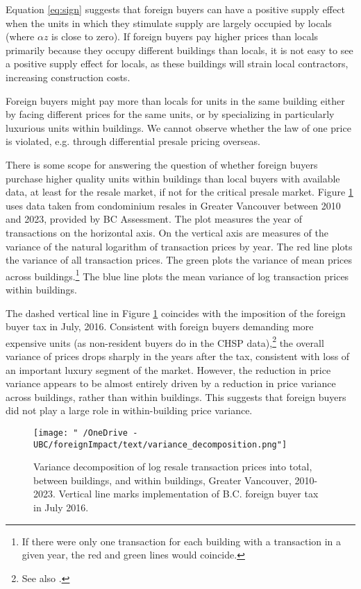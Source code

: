 \documentclass[12pt]{article}
\begin{document}
Equation \eqref{eq:sign} suggests that foreign buyers can have a positive
supply effect when the units in which they stimulate supply are largely
occupied by locals (where $\alpha z$ is close to zero). If foreign buyers pay
higher prices than locals primarily because they occupy different buildings than
locals, it is not easy to see a positive supply effect for
locals, as these buildings will strain local contractors, increasing
construction costs.

Foreign buyers might pay more than locals for units in the same building either
by facing different prices for the same units, or by specializing in
particularly luxurious units within buildings. We cannot observe whether the
law of one price is violated, e.g.  through differential presale pricing
overseas.

There is some scope for answering the question of whether foreign buyers
purchase higher quality units within buildings than local buyers with available
data, at least for the resale market, if not for the critical presale market.
Figure \ref{fig:varianceDecomposition} uses data taken from condominium
resales in Greater Vancouver between 2010 and 2023, provided by BC Assessment.
The plot measures the year of transactions on the horizontal axis. On the
vertical axis are measures of the variance of the natural logarithm of
transaction prices by year. The red line plots the variance of all transaction
prices. The green plots the variance of mean prices across
buildings.\footnote{If there were only one transaction for each building with a
transaction in a given year, the red and green lines would coincide.} The blue
line plots the mean variance of log transaction prices within buildings. 

The dashed vertical line in Figure \ref{fig:varianceDecomposition} coincides
with the imposition of the foreign buyer tax in July, 2016. Consistent with
foreign buyers demanding more expensive units (as non-resident buyers do in the
CHSP data),\footnote{See also
\textcite{gellatlyNonresidentOwnershipResidential2017}.}  the overall variance
of prices drops sharply in the years after the tax, consistent with loss of an
important luxury segment of the market.  However, the reduction in price
variance appears to be almost entirely driven by a reduction in price variance
across buildings, rather than within buildings. This suggests that foreign
buyers did not play a large role in within-building price variance.

\begin{figure}
	\caption{\label{fig:varianceDecomposition} Variance decomposition of log resale transaction prices into total, between buildings, and within buildings, Greater Vancouver, 2010-2023. Vertical line marks implementation of B.C. foreign buyer tax in July 2016.}
\texttt{[image: "~/OneDrive - UBC/foreignImpact/text/variance\_decomposition.png"]}
\end{figure}
\end{document}
